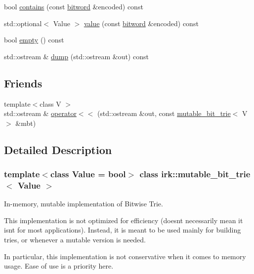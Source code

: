 \begin{DoxyCompactItemize}
\item 
bool \mbox{\hyperlink{classirk_1_1mutable__bit__trie_ab45e17c9d8b88f14654d52e27c092c30}{contains}} (const \mbox{\hyperlink{namespaceirk_a5d1a67079cf6423ecaededebe848f083}{bitword}} \&encoded) const
\item 
std\+::optional$<$ Value $>$ \mbox{\hyperlink{classirk_1_1mutable__bit__trie_ad0bb2e18842b722d7deb1a5d4b72b890}{value}} (const \mbox{\hyperlink{namespaceirk_a5d1a67079cf6423ecaededebe848f083}{bitword}} \&encoded) const
\item 
bool \mbox{\hyperlink{classirk_1_1mutable__bit__trie_abbfbe73cb98af4bb0375f00229cec50a}{empty}} () const
\item 
std\+::ostream \& \mbox{\hyperlink{classirk_1_1mutable__bit__trie_ac97dbb665a28127d1e2a3e0d6fbcae66}{dump}} (std\+::ostream \&out) const
\end{DoxyCompactItemize}
\subsection*{Friends}
\begin{DoxyCompactItemize}
\item 
{\footnotesize template$<$class V $>$ }\\std\+::ostream \& \mbox{\hyperlink{classirk_1_1mutable__bit__trie_a91e672d5695fe80b17bbfd474d593ec2}{operator$<$$<$}} (std\+::ostream \&out, const \mbox{\hyperlink{classirk_1_1mutable__bit__trie}{mutable\+\_\+bit\+\_\+trie}}$<$ V $>$ \&mbt)
\end{DoxyCompactItemize}


\subsection{Detailed Description}
\subsubsection*{template$<$class Value = bool$>$\newline
class irk\+::mutable\+\_\+bit\+\_\+trie$<$ Value $>$}

In-\/memory, mutable implementation of Bitwise Trie. 

This implementation is not optimized for efficiency (doesn\textquotesingle{}t necessarily mean it isn\textquotesingle{}t for most applications). Instead, it is meant to be used mainly for building tries, or whenever a mutable version is needed.

In particular, this implementation is not conservative when it comes to memory usage. Ease of use is a priority here. 

